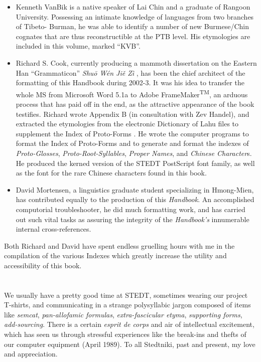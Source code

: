 \documentclass[12pt]{article}
\begin{document}
\begin{itemize}
\item Kenneth VanBik is a native speaker of Lai Chin and a graduate of Rangoon University. Possessing an intimate knowledge of languages from two branches of Tibeto- Burman, he was able to identify a number of new Burmese/Chin cognates that are thus reconstructible at the PTB level. His etymologies are included in this volume, marked ``KVB''.
\item Richard S. Cook, currently producing a mammoth dissertation on the Eastern Han ``Grammaticon''  {\it Shu\=o W\'en Ji\v{e} Z\`i} , has been the chief architect of the formatting of this Handbook  during 2002-3. It was his idea to transfer the whole MS from Microsoft Word 5.1a to Adobe FrameMaker\textsuperscript{TM}, an arduous process that has paid off in the end, as the attractive appearance of the book testifies. Richard wrote Appendix B  (in consultation with Zev Handel), and extracted the etymologies from the electronic  Dictionary of Lahu  files to supplement the Index of Proto-Forms . He wrote the computer programs to format the Index of Proto-Forms  and to generate and format the indexes of {\it Proto-Glosses}, {\it Proto-Root-Syllables}, {\it Proper Names}, and {\it Chinese Character}s. He produced the kerned version of the STEDT PostScript font family, as well as the font for the rare Chinese characters found in this book.
\item David Mortensen, a linguistics graduate student specializing in Hmong-Mien, has contributed equally to the production of this {\it Handbook}. An accomplished computorial troubleshooter, he did much formatting work, and has carried out such vital tasks as assuring the integrity of the {\it Handbook's} innumerable internal cross-references.
\end{itemize}
Both Richard and David have spent endless gruelling hours with me in the compilation of the various Indexes which greatly increase the utility and accessibility of this book.
      
\section*{}
We usually have a pretty good time at STEDT, sometimes wearing our project T-shirts, and communicating in a strange polysyllabic jargon composed of items like {\it semcat}, {\it pan-allofamic formulas}, {\it extra-fascicular etyma}, {\it supporting forms}, {\it add-sourcing}. There is a certain {\it esprit de corps} and air of intellectual excitement, which has seen us through stressful experiences like the break-ins and thefts of our computer equipment (April 1989). To all Stedtniki, past and present, my love and appreciation.
\end{document}
